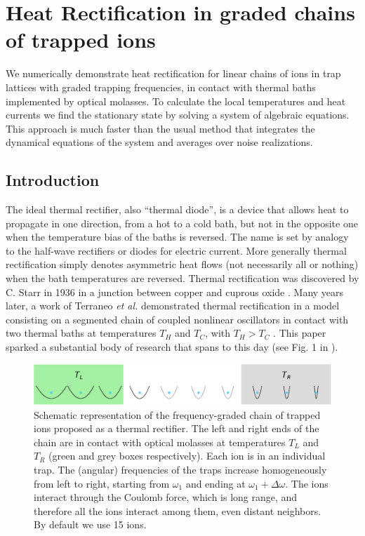 
\chapter{Heat Rectification in graded chains of trapped ions}
\label{Chapter5}
%
We numerically demonstrate heat rectification for linear chains of  ions in trap lattices with  graded  trapping frequencies, in contact with
thermal baths implemented by optical molasses.  To calculate the local temperatures and heat currents we find the stationary state
by solving a system of algebraic equations. This approach is much faster than the usual method
that integrates the dynamical equations of the system and averages over noise realizations.
%
\newpage
%
\section{Introduction\label{IntroductionRectificationChainOfIons}}

The ideal thermal rectifier, also ``thermal diode'',  is a device that allows heat to propagate in one direction, from a hot to a cold bath, but not in the opposite one when the temperature bias of the baths is  reversed. The name is set by analogy to the
half-wave rectifiers or diodes for electric current. More generally thermal rectification simply denotes
asymmetric heat flows (not necessarily all or nothing) when the bath temperatures are reversed.
 Thermal rectification was discovered by C. Starr in 1936 in a junction between copper and cuprous oxide \cite{Starr1936}. Many years later, a work of Terraneo \textit{et al.} demonstrated thermal rectification in a model
consisting on a segmented chain of coupled nonlinear oscillators  in contact with two thermal baths at temperatures $T_H$ and $T_C$, with $T_H > T_C$ \cite{Terraneo2002}. This paper sparked a substantial body of research  that spans to this day \cite{Pereira2019} (see Fig. 1 in \cite{Roberts2011}).

\begin{figure}
    \centering
    \includegraphics[width=0.9\linewidth]{Figures/Diagram.eps}
    \caption{Schematic representation  of the frequency-graded chain of trapped ions proposed as a thermal rectifier. The left and right ends of the chain are in contact with optical molasses at temperatures $T_L$ and $T_R$ (green and grey boxes respectively). Each ion is in an individual trap. The (angular) frequencies of the traps increase homogeneously from left to right, starting from $\omega_1$ and ending at $\omega_1+\Delta\omega$. The ions interact through the Coulomb force, which is long range, and therefore all the ions interact among them, even distant neighbors. By default  we use 15 ions.}
    \label{fig:Diagram}
\end{figure}


